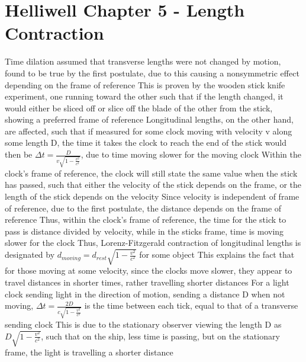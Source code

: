 \documentclass[11 pt, twoside]{article}
\newenvironment{outline*}
{
	\begin{outline}[enumerate]
	}
	{\end{outline}
}
\begin{document}
\section{Helliwell Chapter 5 - Length Contraction}
\begin{outline*}
\1 Time dilation assumed that transverse lengths were not changed by motion, found to be true by the first postulate, due to this causing a nonsymmetric effect depending on the frame of reference
\2 This is proven by the wooden stick knife experiment, one running toward the other such that if the length changed, it would either be sliced off or slice off the blade of the other from the stick, showing a preferred frame of reference
\1 Longitudinal lengths, on the other hand, are affected, such that if measured for some clock moving with velocity v along some length D, the time it takes the clock to reach the end of the stick would then be $\Delta t = \frac{D}{v\sqrt{1 - \frac{v^2}{c^2}}}$, due to time moving slower for the moving clock
\2 Within the clock's frame of reference, the clock will still state the same value when the stick has passed, such that either the velocity of the stick depends on the frame, or the length of the stick depends on the velocity
\3 Since velocity is independent of frame of reference, due to the first postulate, the distance depends on the frame of reference
\3 Thus, within the clock's frame of reference, the time for the stick to pass is distance divided by velocity, while in the sticks frame, time is moving slower for the clock
\2 Thus, Lorenz-Fitzgerald contraction of longitudinal lengths is designated by $d_{moving} = d_{rest}\sqrt{1 - \frac{v^2}{c^2}}$ for some object
\1 This explains the fact that for those moving at some velocity, since the clocks move slower, they appear to travel distances in shorter times, rather travelling shorter distances
\1 For a light clock sending light in the direction of motion, sending a distance D when not moving, $\Delta t = \frac{2D}{c\sqrt{1 - \frac{v^2}{c^2}}}$ is the time between each tick, equal to that of a transverse sending clock
\2 This is due to the stationary observer viewing the length D as $D\sqrt{1 - \frac{v^2}{c^2}}$, such that on the ship, less time is passing, but on the stationary frame, the light is travelling a shorter distance
\end{outline*}
\end{document}
